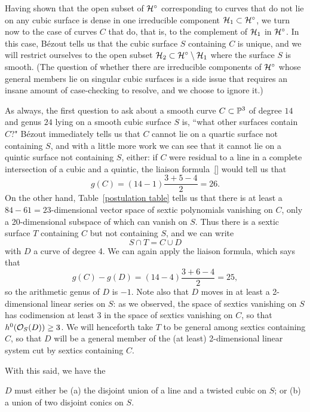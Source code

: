 Having shown that the open subset of $\cH^\circ$ corresponding to curves that do not lie on any cubic surface is dense in one irreducible component  $\cH_1 \subset \cH^\circ$, we turn now to the case of curves $C$ that do, that is, to the complement of $\cH_1$ in $\cH^\circ$. In this case, B\'ezout tells us that the cubic surface $S$ containing $C$ is unique, and we will restrict ourselves to the open subset $\cH_2 \subset \cH^\circ \setminus \cH_1$ where the surface $S$ is smooth. (The question of whether there are irreducible components of $\cH^\circ$ whose general members lie on singular cubic surfaces is a side issue that requires an insane amount of case-checking to resolve, and we choose to ignore it.) 

As always, the first question to ask about a smooth curve $C \subset \PP^3$ of degree $14$ and genus $24$ lying on a smooth cubic surface $S$ is, ``what other surfaces contain $C$?" B\'ezout immediately tells us that $C$ cannot lie on a quartic surface not containing $S$, and with a little more work we can see that it cannot lie on a quintic surface not containing $S$, either: if $C$ were residual to a line in a complete intersection of a cubic and a quintic, the liaison formula~\ref{} would tell us that 
$$
g(C) = (14-1)\frac{3+5-4}{2} = 26.
$$
On the other hand, Table~\ref{postulation table} tells us that there is at least a $84-61 = 23$-dimensional vector space of sextic polynomials vanishing on  $C$, only a 20-dimensional subspace of which can vanish on $S$. Thus there is a sextic surface $T$ containing $C$ but not containing $S$, and we can write
$$
S \cap T = C \cup D
$$
with $D$ a curve of degree 4. We can again apply the liaison formula, which says that
$$
g(C) - g(D) = (14 - 4)\frac{3+6-4}{2} = 25,
$$
so the arithmetic genus of $D$ is $-1$. Note also that $D$ moves in at least a 2-dimensional linear series on $S$: as we observed, the space of sextics vanishing on $S$ has codimension at least 3 in the space of sextics vanishing on $C$, so that $h^0(\cO_S(D)) \geq 3$. We will henceforth take $T$ to be general among sextics containing $C$, so that $D$ will be a general member of the (at least) 2-dimensional linear system cut by sextics containing $C$.

With this said, we have the

\begin{proposition}
$D$ must either be (a) the disjoint union of a line and a twisted cubic on $S$; or (b) a union of two disjoint conics on $S$.
\end{proposition}


